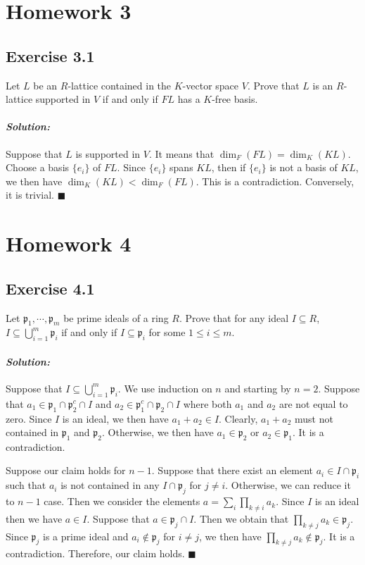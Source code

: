 \documentclass[12pt, a4paper]{article}
\newcommand{\p}{\mathfrak{p}}
\newenvironment{solution}
  {\paragraph{\textit{Solution:}}\par\medskip}
  {\hfill$\blacksquare$\vspace{0.1cm}}
\begin{document}
\section*{Homework 3}
\subsection*{Exercise 3.1}
Let $L$ be an $R$-lattice contained in the $K$-vector space $V$.
Prove that $L$ is an $R$-lattice supported in $V$ if and only if $FL$ has a $K$-free basis.
\begin{solution}
    Suppose that $L$ is supported in $V$. It means that $\dim_F(FL)=\dim_K(KL)$.  Choose a basis $\{e_i\}$ of $FL$.
    Since $\{e_i\}$ spans $KL$, then if $\{e_i\}$ is not a basis of $KL$, we then have $\dim_K(KL)<\dim_F(FL)$. This is a contradiction.
    Conversely, it is trivial.
\end{solution}


\section*{Homework 4}

\subsection*{Exercise 4.1}
Let $\mathfrak{p}_1, \cdots, \mathfrak{p}_m$ be prime ideals of a ring $R$. Prove that for any ideal $I \subseteq R$, $I \subseteq \bigcup_{i=1}^m \mathfrak{p}_i$ if and only if $I \subseteq \mathfrak{p}_i$ for some $1 \leq i \leq m$.
\begin{solution}
    Suppose that $I \subseteq \bigcup_{i=1}^m \mathfrak{p}_i$. 
    We use induction on $n$ and starting by $n=2$.
    Suppose that $a_1\in \p_1\cap \p_2^c\cap I$ and $a_2\in \p_1^c\cap\p_2\cap I$ where both $a_1$ and $a_2$ are not equal to zero.
    Since $I$ is an ideal, we then have $a_1+a_2\in I$. Clearly, $a_1+a_2$ must not contained in $\p_1$ and $\p_2$. Otherwise, we then have $a_1\in\p_2$ or $a_2\in\p_1$. It is a contradiction.

    Suppose our claim holds for $n-1$. Suppose that there exist an element $a_i\in I\cap \p_i$ such that $a_i$ is not contained in any $I\cap\p_j$ for $j\neq i$. Otherwise, we can reduce it to $n-1$ case.
    Then we consider the elements $a=\sum_{i}\prod_{k\neq i} a_k$. Since $I$ is an ideal then we have $a\in I$. Suppose that $a\in\p_j\cap I$.
    Then we obtain that $\prod_{k\neq j} a_k\in \p_j$. Since $\p_j$ is a prime ideal and $a_i\notin \p_j$ for $i\neq j$, we then have $\prod_{k\neq j} a_k\notin \p_j$.
    It is a contradiction.
    Therefore, our claim holds.
\end{solution}
\end{document}
